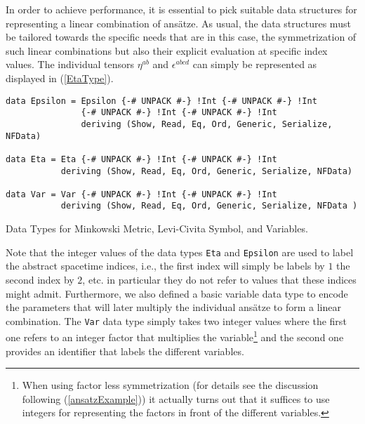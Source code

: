 In order to achieve performance, it is essential to pick suitable data structures for representing a linear combination of ansätze. As usual, the data structures must be tailored towards the specific needs that are in this case, the symmetrization of such linear combinations but also their explicit evaluation at specific index values.  
The individual tensors $\eta^{ab}$ and $\epsilon^{abcd}$ can simply be represented as displayed in (\ref{EtaType}).
\begin{listing}[hbt!] 
\begin{verbatim}
data Epsilon = Epsilon {-# UNPACK #-} !Int {-# UNPACK #-} !Int
               {-# UNPACK #-} !Int {-# UNPACK #-} !Int
               deriving (Show, Read, Eq, Ord, Generic, Serialize, NFData)

data Eta = Eta {-# UNPACK #-} !Int {-# UNPACK #-} !Int 
           deriving (Show, Read, Eq, Ord, Generic, Serialize, NFData)

data Var = Var {-# UNPACK #-} !Int {-# UNPACK #-} !Int 
           deriving (Show, Read, Eq, Ord, Generic, Serialize, NFData )
\end{verbatim} 
\caption{Data Types for Minkowski Metric, Levi-Civita Symbol, and Variables.}\label{EtaType}
\end{listing}
Note that the integer values of the data types \texttt{Eta} and \texttt{Epsilon} are used to label the abstract spacetime indices, i.e., the first index will simply be labels by $1$ the second index by $2$, etc. in particular they do not refer to values that these indices might admit.
Furthermore, we also defined a basic variable data type to encode the parameters that will later multiply the individual ansätze to form a linear combination. The \texttt{Var}
data type simply takes two integer values where the first one refers to an integer factor that multiplies the variable\footnote{When using factor less symmetrization (for details see the discussion following (\ref{ansatzExample})) it actually turns out that it suffices to use integers for representing the factors in front of the different variables.} and the second one provides an identifier that labels the different variables. 

